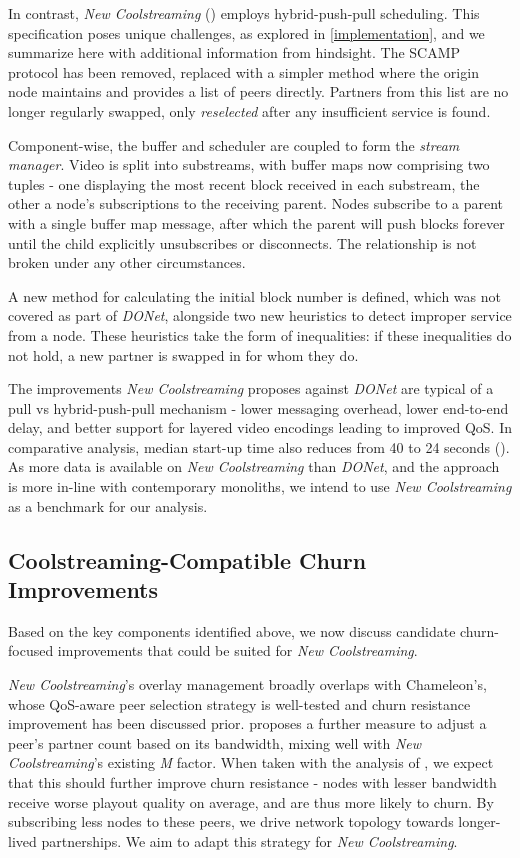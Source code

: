 \documentclass[12pt,a4paper]{article}
\begin{document}
In contrast, \textit{New Coolstreaming} (\cite{Li2008}) employs hybrid-push-pull scheduling. This specification poses unique challenges, as explored in \ref{implementation}, and we summarize here with additional information from hindsight. The SCAMP protocol has been removed, replaced with a simpler method where the origin node maintains and provides a list of peers directly. Partners from this list are no longer regularly swapped, only \textit{reselected} after any insufficient service is found.

Component-wise, the buffer and scheduler are coupled to form the \textit{stream manager}. Video is split into substreams, with buffer maps now comprising two tuples - one displaying the most recent block received in each substream, the other a node's subscriptions to the receiving parent. Nodes subscribe to a parent with a single buffer map message, after which the parent will push blocks forever until the child explicitly unsubscribes or disconnects. The relationship is not broken under any other circumstances.

A new method for calculating the initial block number is defined, which was not covered as part of \textit{DONet}, alongside two new heuristics to detect improper service from a node. These heuristics take the form of inequalities: if these inequalities do not hold, a new partner is swapped in for whom they do.

The improvements \textit{New Coolstreaming} proposes against \textit{DONet} are typical of a pull vs hybrid-push-pull mechanism - lower messaging overhead, lower end-to-end delay, and better support for layered video encodings leading to improved QoS. In comparative analysis, median start-up time also reduces from 40 to 24 seconds (\cite{Li2007}). As more data is available on \textit{New Coolstreaming} than \textit{DONet}, and the approach is more in-line with contemporary monoliths, we intend to use \textit{New Coolstreaming} as a benchmark for our analysis.

\subsection{Coolstreaming-Compatible Churn Improvements} \label{litreview:specifics}
Based on the key components identified above, we now discuss candidate churn-focused improvements that could be suited for \textit{New Coolstreaming}.

\textit{New Coolstreaming}'s overlay management broadly overlaps with Chameleon's, whose QoS-aware peer selection strategy is well-tested and churn resistance improvement has been discussed prior. \cite{Wang2013} proposes a further measure to adjust a peer's partner count based on its bandwidth, mixing well with \textit{New Coolstreaming}'s existing \textit{M} factor. When taken with the analysis of \cite{Vassilakis2010}, we expect that this should further improve churn resistance - nodes with lesser bandwidth receive worse playout quality on average, and are thus more likely to churn. By subscribing less nodes to these peers, we drive network topology towards longer-lived partnerships. We aim to adapt this strategy for \textit{New Coolstreaming}.
\end{document}
